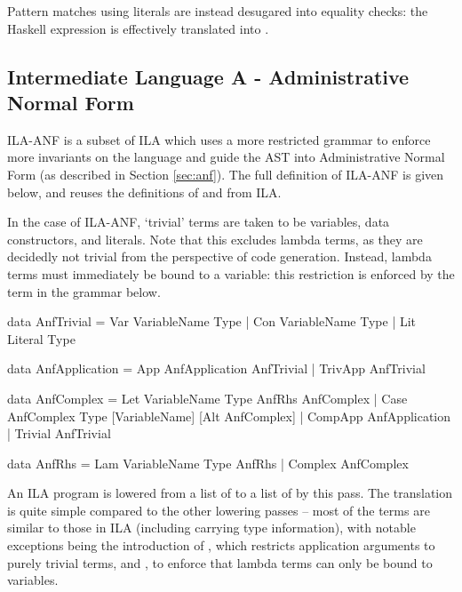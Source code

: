\documentclass[dissertation.tex]{subfiles}
\begin{document}
{{{            Pattern matches using literals are instead desugared into equality checks: the Haskell expression  is effectively translated into .
        }
    }
    \subsection{Intermediate Language A - Administrative Normal Form}
    {
        ILA-ANF is a subset of ILA which uses a more restricted grammar to enforce more invariants on the language and guide the AST into Administrative Normal Form (as described in Section \ref{sec:anf}). The full definition of ILA-ANF is given below, and reuses the definitions of  and  from ILA. 

        In the case of ILA-ANF, `trivial' terms are taken to be variables, data constructors, and literals. Note that this excludes lambda terms, as they are decidedly not trivial from the perspective of code generation. Instead, lambda terms must immediately be bound to a variable: this restriction is enforced by the  term in the grammar below.

        \begin{haskellfigure}
        data AnfTrivial = Var VariableName Type
                        | Con VariableName Type
                        | Lit Literal Type

        data AnfApplication = App AnfApplication AnfTrivial
                            | TrivApp AnfTrivial

        data AnfComplex = Let VariableName Type AnfRhs AnfComplex
                        | Case AnfComplex Type [VariableName] [Alt AnfComplex]
                        | CompApp AnfApplication
                        | Trivial AnfTrivial

        data AnfRhs = Lam VariableName Type AnfRhs
                    | Complex AnfComplex
        \end{haskellfigure}

        An ILA program is lowered from a list of  to a list of  by this pass. The translation is quite simple compared to the other lowering passes -- most of the terms are similar to those in ILA (including carrying type information), with notable exceptions being the introduction of , which restricts application arguments to purely trivial terms, and , to enforce that lambda terms can only be bound to variables.
    }
}
\end{document}
